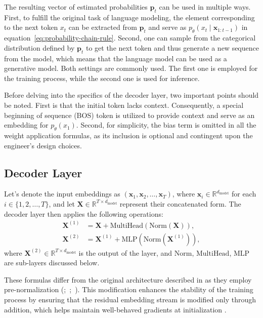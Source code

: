 The resulting vector of estimated probabilities \(\mathbf{p}_t\) can be used in multiple ways. First, to fulfill the original task of language modeling, the element corresponding to the next token \(x_t\) can be extracted from \(\mathbf{p}_t\) and serve as \(p_{\theta}(x_t \mid \bm{x}_{1:t-1})\) in equation~\ref{eq:probability-chain-rule}. Second, one can sample from the categorical distribution defined by \(\mathbf{p}_t\) to get the next token and thus generate a new sequence from the model, which means that the language model can be used as a generative model. Both settings are commonly used. The first one is employed for the training process, while the second one is used for inference.

Before delving into the specifics of the decoder layer, two important points should be noted. First is that the initial token lacks context. Consequently, a special beginning of sequence (BOS) token is utilized to provide context and serve as an embedding for \(p_\theta(x_1)\). Second, for simplicity, the bias term is omitted in all the weight application formulas, as its inclusion is optional and contingent upon the engineer's design choices.

\subsection{Decoder Layer}

Let's denote the input embeddings as \((\mathbf{x}_1, \mathbf{x}_2, \ldots, \mathbf{x}_{T})\), where \(\mathbf{x}_i \in \mathbb{R}^{d_{\mathrm{model}}}\) for each \(i \in \{1, 2, \ldots, T\}\), and let \(\mathbf{X} \in \mathbb{R}^{T \times d_{\mathrm{model}}}\) represent their concatenated form. The decoder layer then applies the following operations:
\begin{align}
    \mathbf{X}^{(1)} &= \mathbf{X} + \mathrm{MultiHead}(\mathrm{Norm}(\mathbf{X})), \\
    \mathbf{X}^{(2)} &= \mathbf{X}^{(1)} + \mathrm{MLP}(\mathrm{Norm}(\mathbf{X}^{(1)})),
\end{align}
where \(\mathbf{X}^{(2)} \in \mathbb{R}^{T \times d_{\mathrm{model}}}\) is the output of the layer, and \(\mathrm{Norm}\), \(\mathrm{MultiHead}\), \(\mathrm{MLP}\) are sub-layers discussed below.

These formulas differ from the original architecture described in \citet{vaswani2017} as they employ pre-normalization (\cite{baevski2018};~\cite{child2019};~\cite{wang2019}). This modification enhances the stability of the training process by ensuring that the residual embedding stream is modified only through addition, which helps maintain well-behaved gradients at initialization \parencite{xiong2020}.

